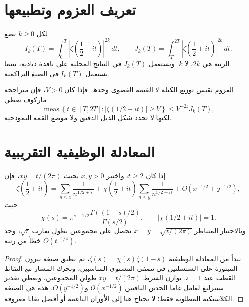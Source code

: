 \section{تعريف العزوم وتطبيعها}

\begin{definition}
\label{def:ch22-continuous-moment}
\provedhere
لكل \(k\ge0\) نضع
\[
I_k(T)=\int_0^T\left|\zeta\!\left(\frac12+it\right)\right|^{2k}\,dt,
\qquad
J_k(T)=\int_T^{2T}\left|\zeta\!\left(\frac12+it\right)\right|^{2k}\,dt.
\]
الرتبة هي \(2k\)، لا \(k\). ويستعمل \(J_k(T)\) في النتائج المحلية على نافذة ديادية، بينما يستعمل \(I_k(T)\) في الصيغ التراكمية.
\end{definition}

العزوم تقيس توزيع الكتلة لا القيمة القصوى وحدها. فإذا كان \(V>0\)، فإن متراجحة ماركوف تعطي
\[
\operatorname{meas}\left\{t\in[T,2T]:|\zeta(1/2+it)|\ge V\right\}
\le V^{-2k}J_k(T),
\]
لكنها لا تحدد شكل الذيل الدقيق ولا موضع القمة النموذجية.

\section{المعادلة الوظيفية التقريبية}

\begin{proposition}
\label{prop:ch22-afe}
\provedhere
إذا كان \(t\ge2\)، واختير \(x,y>0\) بحيث \(xy=t/(2\pi)\)، فإن
\[
\zeta\!\left(\frac12+it\right)
=
\sum_{n\le x}\frac1{n^{1/2+it}}
+
\chi\!\left(\frac12+it\right)
\sum_{n\le y}\frac1{n^{1/2-it}}
+O\!\left(x^{-1/2}+y^{-1/2}\right),
\]
حيث
\[
\chi(s)=\pi^{s-1/2}\frac{\Gamma((1-s)/2)}{\Gamma(s/2)},
\qquad |\chi(1/2+it)|=1.
\]
وبالاختيار المتناظر \(x=y=\sqrt{t/(2\pi)}\) نحصل على مجموعين بطول يقارب \(\sqrt t\)، وحد خطأ من رتبة \(O(t^{-1/4})\).
\end{proposition}

\begin{proof}
نبدأ من المعادلة الوظيفية \(\zeta(s)=\chi(s)\zeta(1-s)\)، ثم نطبق صيغة بيرون المبتورة على السلسلتين في نصفي المستوى المناسبين، ونحرك المسار مع التقاط القطب عند \(s=1\). يوازن الشرط \(xy=t/(2\pi)\) طولي المجموعين، ويعطي تقدير ستيرلنغ لعامل غاما الحدين الباقيين \(O(x^{-1/2})\) و\(O(y^{-1/2})\). هذه هي الصيغة الكلاسيكية المطلوبة فقط؛ لا نحتاج هنا إلى الأوزان الناعمة أو أفضل بقايا معروفة.
\end{proof}

